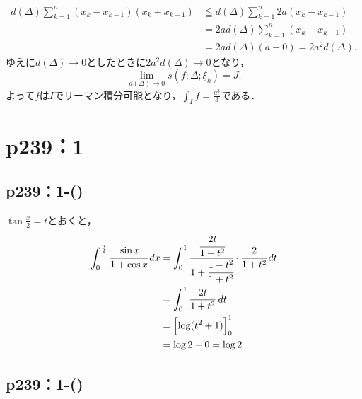 \begin{tanswer}
    \begin{align*}
        d(\Delta) \sum_{k=1}^{n} (x_k - x_{k-1}) (x_k + x_{k-1}) & \leqq d(\Delta) \sum_{k=1}^{n} 2a (x_k - x_{k-1}) \\
                                                                 & = 2a d(\Delta) \sum_{k=1}^{n} (x_k - x_{k-1})     \\
                                                                 & = 2a d(\Delta) (a - 0) = 2a^2 d(\Delta).
    \end{align*}
    ゆえに$d (\Delta) \to 0$としたときに$2a^2 d(\Delta) \to 0$となり，
    \[
        \lim_{d(\Delta) \to 0} s(f;\Delta; \xi_k)=J.
    \]
    よって$f$は$I$でリーマン積分可能となり，$\int_{I} f = \frac{a^3}{3}$である．
\end{tanswer}


\section*{p239：1}

\subsection*{p239：1-()}

\begin{tanswer}
    $\tan \frac{x}{2}=t$とおくと，
    \begin{align*}
        \int_{0}^{\frac{\pi}{2}} \cfrac{\sin x}{1+\cos x} \, dx & = \int_{0}^{1} \cfrac{\cfrac{2t}{1+t^2}}{1+\cfrac{1-t^2}{1+t^2}} \cdot \cfrac{2}{1+t^2} \, dt \\
                                                                & = \int_{0}^{1} \frac{2t}{1+t^2} \, dt                                                         \\
                                                                & = \Bigl[\log (t^2+1)\Bigl]_{0}^{1}                                                            \\
                                                                & = \log 2-0 = \log 2
    \end{align*}
\end{tanswer}


\subsection*{p239：1-()}

